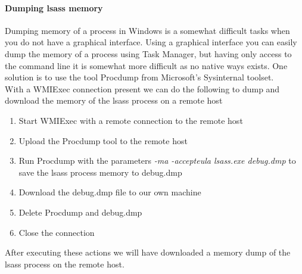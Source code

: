 \documentclass{article}
\begin{document}
\paragraph{Dumping \gls{lsass} memory}
Dumping memory of a process in Windows is a somewhat difficult tasks when you do not have a graphical interface. Using a graphical interface you can easily dump the memory of a process using Task Manager\cite{url:microsoft:dump-memory-task-manager}, but having only access to the command line it is somewhat more difficult as no native ways exists. One solution is to use the tool Procdump from Microsoft's Sysinternal toolset.\\
With a WMIExec connection present we can do the following to dump and download the memory of the \gls{lsass} process on a remote host
\begin{enumerate}
    \item Start WMIExec with a remote connection to the remote host
    \item Upload the Procdump tool to the remote host
    \item Run Procdump with the parameters \emph{-ma -accepteula lsass.exe debug.dmp} to save the \gls{lsass} process memory to debug.dmp
    \item Download the debug.dmp file to our own machine
    \item Delete Procdump and debug.dmp
    \item Close the connection
\end{enumerate}

After executing these actions we will have downloaded a memory dump of the \gls{lsass} process on the remote host.
\end{document}
